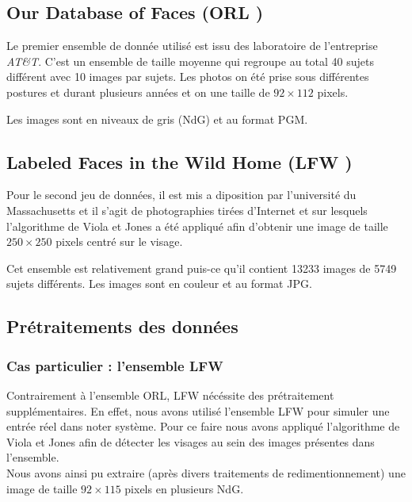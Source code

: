 \documentclass[a4paper,10pt,twocolumn]{extarticle}
\begin{document}
\subsection{Our Database of Faces (ORL \cite{orl})}
Le premier ensemble de donnée utilisé est issu des laboratoire de l'entreprise \textit{AT\&T}. C'est un ensemble de taille moyenne qui regroupe au total 40 sujets différent avec 10 images par sujets. Les photos on été prise sous différentes postures et durant plusieurs années et on une taille de $92 \times 112$ pixels.

Les images sont en niveaux de gris (NdG) et au format PGM.

\subsection{Labeled Faces in the Wild Home (LFW \cite{lfw})}
Pour le second jeu de données, il est mis a diposition par l'université du Massachusetts et il s'agit de photographies tirées d'Internet et sur lesquels l'algorithme de Viola et Jones \cite{viola01} a été appliqué afin d'obtenir une image de taille $250 \times 250$ pixels centré sur le visage.

Cet ensemble est relativement grand puis-ce qu'il contient 13233 images de 5749 sujets différents. Les images sont en couleur et au format JPG.

\subsection{Prétraitements des données}
\subsubsection{Cas particulier : l'ensemble LFW}
Contrairement à l'ensemble ORL, LFW nécéssite des prétraitement supplémentaires. En effet, nous avons utilisé l'ensemble LFW pour simuler une entrée réel dans noter système. Pour ce faire nous avons appliqué l'algorithme de Viola et Jones afin de détecter les visages au sein des images présentes dans l'ensemble.\\
Nous avons ainsi pu extraire (après divers traitements de redimentionnement) une image de taille $92 \times 115$ pixels en plusieurs NdG.
\end{document}
